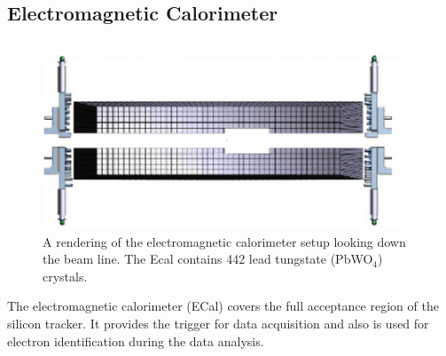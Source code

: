 \documentclass[b1]{sciposter}
\begin{document}
\begin{multicols}{3}
	\subsection*{Electromagnetic Calorimeter}
	\begin{figure}
		\begin{center}
			\includegraphics[width=0.95\textwidth]{ECal_looking_downstream}
		\end{center}
		\caption{A rendering of the electromagnetic calorimeter setup looking down the beam line. %
		The Ecal contains 442 lead tungstate (PbWO$_4$) crystals.
		}
	\end{figure}

	The electromagnetic calorimeter (ECal) covers the full acceptance region of the silicon tracker.
	It provides the trigger for data acquisition and also
	is used for electron identification during the data analysis. 




\end{multicols}
\end{document}
